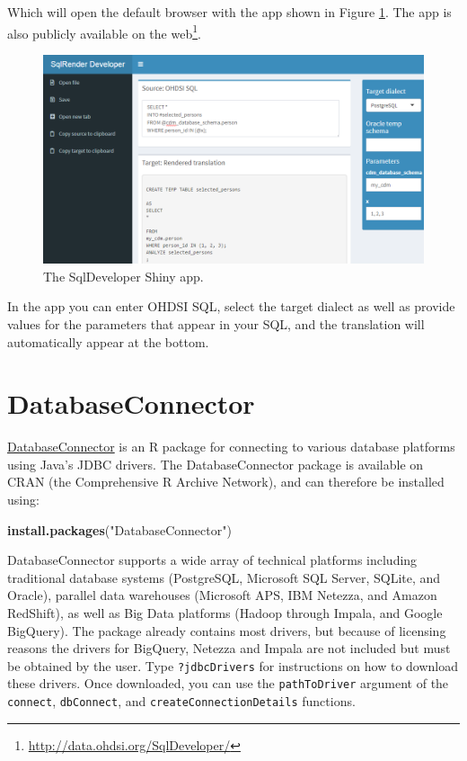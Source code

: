 \documentclass[11pt]{book}
\newenvironment{Shaded}{\begin{snugshade}}{\end{snugshade}}
\newcommand{\KeywordTok}[1]{\textcolor[rgb]{0.13,0.29,0.53}{\textbf{#1}}}
\newcommand{\StringTok}[1]{\textcolor[rgb]{0.31,0.60,0.02}{#1}}
\newcommand{\NormalTok}[1]{#1}
\let\rmarkdownfootnote\footnote%
\def\footnote{\protect\rmarkdownfootnote}
\begin{document}
Which will open the default browser with the app shown in Figure
\ref{fig:sqlDeveloper}. The app is also publicly available on the
web\footnote{\url{http://data.ohdsi.org/SqlDeveloper/}}.

\begin{figure}

{\centering \includegraphics[width=1\linewidth]{images/SqlAndR/sqlDeveloper} 

}

\caption{The SqlDeveloper Shiny app.}\label{fig:sqlDeveloper}
\end{figure}

In the app you can enter OHDSI SQL, select the target dialect as well as
provide values for the parameters that appear in your SQL, and the
translation will automatically appear at the bottom.

\section{DatabaseConnector}\label{DatabaseConnector}

\href{https://ohdsi.github.io/DatabaseConnector/}{DatabaseConnector} is
an R package for connecting to various database platforms using Java's
JDBC drivers. The DatabaseConnector package is available on CRAN (the
Comprehensive R Archive Network), and can therefore be installed using:

\begin{Shaded}
\begin{Highlighting}[]
\KeywordTok{install.packages}\NormalTok{(}\StringTok{"DatabaseConnector"}\NormalTok{)}
\end{Highlighting}
\end{Shaded}

DatabaseConnector supports a wide array of technical platforms including
traditional database systems (PostgreSQL, Microsoft SQL Server, SQLite,
and Oracle), parallel data warehouses (Microsoft APS, IBM Netezza, and
Amazon RedShift), as well as Big Data platforms (Hadoop through Impala,
and Google BigQuery). The package already contains most drivers, but
because of licensing reasons the drivers for BigQuery, Netezza and
Impala are not included but must be obtained by the user. Type
\texttt{?jdbcDrivers} for instructions on how to download these drivers.
Once downloaded, you can use the \texttt{pathToDriver} argument of the
\texttt{connect}, \texttt{dbConnect}, and
\texttt{createConnectionDetails} functions.
\end{document}
